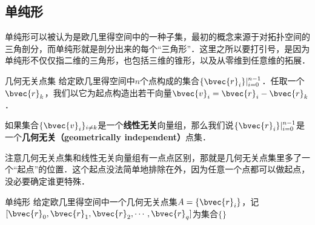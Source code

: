 
\subsection{单纯形}

单纯形可以被认为是欧几里得空间中的一种子集，最初的概念来源于对拓扑空间的三角剖分，而单纯形就是剖分出来的每个“三角形”．这里之所以要打引号，是因为单纯形不仅仅指二维的三角形，也包括三维的锥形，以及从零维到任意维的拓展．

\begin{definition}{几何无关点集}
给定欧几里得空间中$n$个点构成的集合$\{\bvec{r}_i\}|_{i=0}^{n-1}$．任取一个$\bvec{r}_k$，我们以它为起点构造出若干向量$\bvec{v}_i=\bvec{r}_i-\bvec{r}_k$．

如果集合$\{\bvec{v}_i\}_{i\not= k}$是一个\textbf{线性无关}向量组，那么我们说$\{\bvec{r}_i\}|_{i=0}^{n-1}$是一个\textbf{几何无关（geometrically independent）}点集．
\end{definition}

注意几何无关点集和线性无关向量组有一点点区别，那就是几何无关点集里多了一个“起点”的位置．这个起点没法简单地排除在外，因为任意一个点都可以做起点，没必要确定谁更特殊．

\begin{definition}{单纯形}
给定欧几里得空间中一个几何无关点集$A=\{\bvec{r}_i\}$，记$[\bvec{r}_0, \bvec{r}_1, \bvec{r}_2, \cdots, \bvec{r}_q]$为集合$\{\}$
\end{definition}










